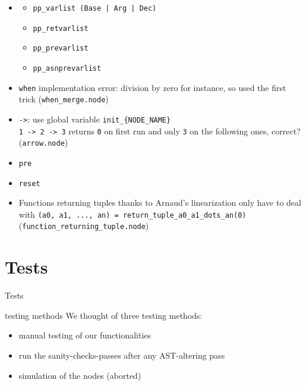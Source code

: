 \documentclass{beamer}
\begin{document}
\begin{frame}
	\begin{itemize}
		\item
			\begin{itemize}
				\item \texttt{pp\_varlist (Base | Arg | Dec)}
				\item \texttt{pp\_retvarlist}
				\item \texttt{pp\_prevarlist}
				\item \texttt{pp\_asnprevarlist}
			\end{itemize}
		\pause
		\item \texttt{when} implementation error: division by zero for instance, so used the first trick (\texttt{when\_merge.node})
		\pause
		\item \texttt{->}: use global variable \texttt{init\_\{NODE\_NAME\}}\\
					\texttt{1 -> 2 -> 3} returns \texttt{0} on first run and only \texttt{3} on the following ones, correct? (\texttt{arrow.node})
		\pause
		\item \texttt{pre}
		\pause
		\item \texttt{reset}%
		\pause
		\item Functions returning tuples thanks to Arnaud's linearization only have to deal with \texttt{(a0, a1, ..., an) = return\_tuple\_a0\_a1\_dots\_an(0)} (\texttt{function\_returning\_tuple.node})
	\end{itemize}
\end{frame}

\section{Tests}
\begin{frame}{Tests}
    \begin{block}{testing methods}
        We thought of three testing methods:
        \begin{itemize}
            \item manual testing of our functionalities
            \item run the sanity-checks-passes after any AST-altering pass
            \item simulation of the nodes (aborted)
        \end{itemize}
    \end{block}
\end{frame}
\end{document}
